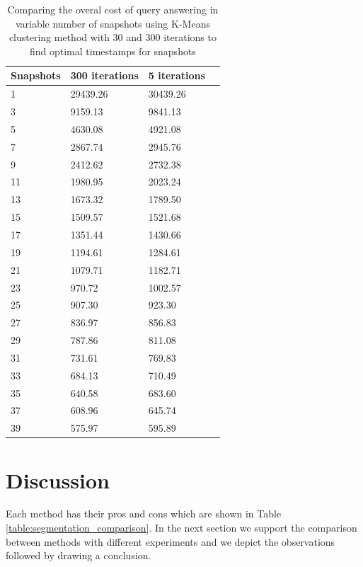 			\begin {center}
			\begin{table}
				\centering
				\caption{Comparing the overal cost of query answering in variable number of snapshots using K-Means clustering method with 30 and 300 iterations to find optimal timestamps for snapshots}
				\label {table:compare_clustring_iterations}
				\begin{tabular}{p{2cm}p{3cm}p{3cm}p{3cm}}
					\hline
					Snapshots  & 300 iterations  & 5 iterations \\ \hline
					1 & 29439.26 & 30439.26 \\  
					3 & 9159.13  & 9841.13\\
					5 & 4630.08  & 4921.08\\
					7 & 2867.74  & 2945.76\\
					9 & 2412.62  & 2732.38\\
					11 & 1980.95  & 2023.24\\
					13 & 1673.32  & 1789.50\\
					15 & 1509.57  & 1521.68\\
					17 & 1351.44  & 1430.66\\
					19 & 1194.61  & 1284.61\\
					21 & 1079.71  & 1182.71\\
					23 & 970.72  & 1002.57\\
					25 & 907.30  & 923.30\\
					27 & 836.97  & 856.83\\
					29 & 787.86  & 811.08\\
					31 & 731.61  & 769.83\\
					33 & 684.13  & 710.49\\
					35 & 640.58  & 683.60\\
					37 & 608.96  & 645.74\\
					39 & 575.97  & 595.89\\\hline
				\end{tabular}
			\end{table}
			\end{center}

		\section{Discussion}
				Each method has their pros and cons which are shown in Table \ref{table:segmentation_comparison}. In the next section we support the comparison between methods with different experiments and we depict the observations followed by drawing a conclusion. 
		
